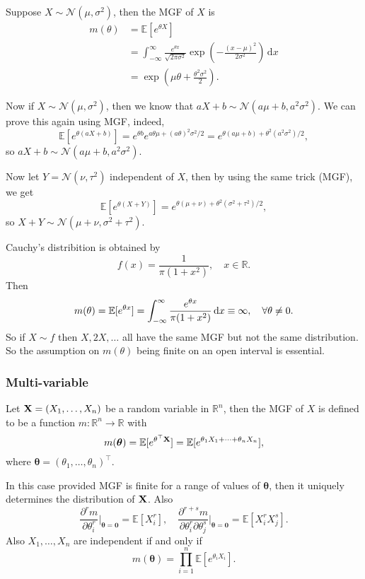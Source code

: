 \begin{example}
    Suppose $X\sim\mathcal N(\mu,\sigma^2)$, then the MGF of $X$ is
    \begin{align*}
        m(\theta)&=\mathbb E[e^{\theta X}]\\
        &=\int_{-\infty}^\infty \frac{e^{\theta x}}{\sqrt{2\pi \sigma^2}}\exp\left( -\frac{(x-\mu)^2}{2\sigma^2}  \right)\,\mathrm dx\\
        &=\exp \left( \mu\theta+\frac{\theta^2\sigma^2}{2} \right).
    \end{align*}

    Now if $X\sim\mathcal N(\mu,\sigma^2)$, then we know that $aX+b\sim\mathcal N(a\mu+b,a^2\sigma^2)$.
    We can prove this again using MGF, indeed,
    $$\mathbb E[e^{\theta(aX+b)}]=e^{\theta b}e^{a\theta\mu+(a\theta)^2\sigma^2/2}=e^{\theta(a\mu +b)+\theta^2(a^2\sigma^2)/2},$$
    so $aX+b\sim\mathcal N(a\mu+b,a^2\sigma^2)$.

    Now let $Y=\mathcal N(\nu,\tau^2)$ independent of $X$, then by using the same trick (MGF), we get
    \[
        \mathbb E[e^{\theta(X+Y)}]=e^{\theta(\mu+\nu)+\theta^2(\sigma^2+\tau^2)/2},
    \]
    so $X+Y\sim\mathcal N(\mu+\nu,\sigma^2+\tau^2)$.
\end{example}
\begin{example}
    Cauchy's distribition is obtained by
    \[
        f(x)=\frac{1}{\pi(1+x^2)},\quad x\in\mathbb R.
    \]
    Then 
    \[
        m(\theta) = {\mathbb{E}}[e^{\theta x}] = \int_{-\infty}^{\infty} \frac{e^{\theta x}}{\pi(1+x^2)} \,\mathrm{d}x \equiv \infty,\quad \forall \theta\neq 0.
    \]
    So if $X\sim f$ then $X,2X,\ldots$ all have the same MGF but not the same distribution.
    So the assumption on $m(\theta)$ being finite on an open interval is essential.
\end{example}

\subsubsection*{Multi-variable}
\begin{definition}
    Let ${\bf X}=(X_1,\ldots,X_n)$ be a random variable in $\mathbb R^n$, then the MGF of $X$ is defined to be a function $m:\mathbb R^n\to\mathbb R$ with
    $$m(\boldsymbol{\theta})=\mathbb E[e^{\theta^\top {\bf X}}]=\mathbb E[e^{\theta_1X_1+\cdots+\theta_nX_n}],$$
    where $\boldsymbol{\theta}=(\theta_1,\ldots,\theta_n)^\top$.
\end{definition}
\begin{theorem}
    In this case provided MGF is finite for a range of values of $ \boldsymbol{\theta} $, then it uniquely determines the distribution of $ {\bf X} $. Also 
    \[
        \frac{\partial^rm}{\partial\theta_i^r}\Big|_{\boldsymbol{\theta}=\mathbf{0}}=\mathbb E[X_i^r],\quad \frac{\partial^{r+s}m}{\partial\theta_i^r\partial\theta_j^s}\Big|_{\boldsymbol{\theta}=\mathbf{0}}=\mathbb E[X_i^rX_j^s].
    \]
    Also $X_1,\ldots,X_n$ are independent if and only if 
    $$m(\boldsymbol{\theta})=\prod_{i=1}^n\mathbb E[e^{\theta_iX_i}].$$
\end{theorem}